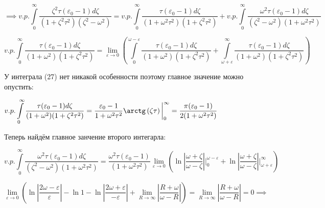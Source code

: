 \documentclass[a4paper,12pt]{article}
\begin{document}
	\begin{equation}
		\implies v.p. \displaystyle\int\limits_{0}^{\infty} \dfrac{\zeta^2 \tau(\varepsilon_0 - 1)d\zeta}{(1+\zeta^2\tau^2)(\zeta^2 - \omega^2)} = v.p. \displaystyle\int\limits_{0}^{\infty} \dfrac{\tau (\varepsilon_0 - 1)d\zeta}{(1+\omega^2 \tau^2)(1+\zeta^2\tau^2) } + v.p.\displaystyle\int\limits_{0}^{\infty} \dfrac{\omega^2 \tau (\varepsilon_0 - 1)d\zeta}{(\zeta^2 - \omega^2) (1+\omega^2\tau^2)} 
	\end{equation}
	
	\begin{equation}
		v.p. \displaystyle\int\limits_{0}^{\infty} \dfrac{\tau(\varepsilon_0 - 1)d\zeta}{(1+\omega^2)(1+\zeta^2\tau^2)} = \lim_{\varepsilon \to 0} \left(\displaystyle\int\limits_{0}^{\omega - \varepsilon} \dfrac{\tau(\varepsilon_0 - 1)d\zeta}{(1+\omega^2)(1+\zeta^2\tau^2)} + \displaystyle\int\limits_{\omega+\varepsilon}^{\infty} \dfrac{\tau(\varepsilon_0 - 1)d\zeta}{(1+\omega^2)(1+\zeta^2\tau^2)} \right)
	\end{equation}
	
	\quad У интеграла (27) нет никакой особенности поэтому главное значение можно опустить:
	
	\begin{center}
		$ v.p. \displaystyle\int\limits_{0}^{\infty} \dfrac{\tau(\varepsilon_0 - 1)d\zeta}{(1+\omega^2)(1+\zeta^2\tau^2)}= \dfrac{\varepsilon_0 - 1}{1+\omega^2 \tau^2} \arctg\left(\zeta\tau\right)\bigg|_{0}^{\infty} = \dfrac{\pi(\varepsilon_0 - 1)}{2(1+\omega^2 \tau^2)} $
	\end{center}
	
	\quad Теперь найдём главное занчение второго интегарла:
	
	\begin{equation}
		v.p.\displaystyle\int\limits_{0}^{\infty} \dfrac{\omega^2 \tau (\varepsilon_0 - 1)d\zeta}{(\zeta^2 - \omega^2) (1+\omega^2\tau^2)} = \dfrac{\omega^2 \tau(\varepsilon_0 - 1)}{(1+\omega^2 \tau^2)} \lim_{\varepsilon \to 0} \left(\ln \left|\dfrac{\omega+\zeta}{\omega - \zeta}\right| \bigg|_{0}^{\omega-\varepsilon} + \ln \left|\dfrac{\omega+\zeta}{\omega - \zeta}\right|\bigg|_{\omega+\varepsilon}^{\infty}\right)
	\end{equation}
	
	\begin{equation}
		\lim_{\varepsilon \to 0}\left(\ln\left|\dfrac{2\omega - \varepsilon}{\varepsilon}\right| - \ln1 - \ln\left|\dfrac{2\omega + \varepsilon}{-\varepsilon}\right| + \lim_{R \to \infty} \left|\dfrac{R + \omega}{\omega - R}\right|\right) = \lim_{R \to \infty} \left|\dfrac{R + \omega}{\omega - R}\right| = 0 \implies
	\end{equation} 
	
\end{document}
